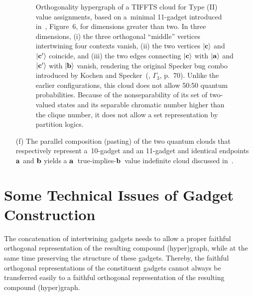 \begin{enumerate}[leftmargin=2.3em,labelsep=4mm]
\begin{figure}[H]
\begin{center}
\begin{tikzpicture} [scale=0.8, rotate= 0]
\end{tikzpicture}
\end{center}
\caption{
\label{2018-c-f-TIFFTS}
Orthogonality hypergraph of a TIFFTS%
 cloud for Type (II) value assignments,
based on a~minimal 11-gadget introduced in~\cite{2018-minimalYIYS}, Figure~6, for dimensions greater than two.
In three dimensions,
(i) the three orthogonal ``middle'' vertices intertwining four contexts vanish,
(ii) the two vertices $\vert {\bf c}\rangle$ and $\vert {\bf c}'\rangle$ coincide, and
(iii) the two edges connecting $\vert {\bf c}\rangle$ with $\vert {\bf a}\rangle$ and $\vert {\bf c}'\rangle$
with $\vert {\bf b}\rangle$ vanish,
rendering the original Specker bug combo introduced by Kochen and Specker~(\cite{Kochen1}, $\Gamma_3$, p.~70).
Unlike the earlier configurations, this cloud does not allow 50:50 quantum probabilities.
Because of the nonseparability of its set of two-valued states
and its separable chromatic number higher than the clique number,
it does not allow a set representation by partition logics.
}
\end{figure}

\item[(f)]
The parallel composition (pasting) of the two quantum clouds that respectively represent a~10-gadget and an 11-gadget
and identical endpoints ${\bf a}$ and ${\bf b}$ yields a ${\bf a}$~true-implies-${\bf b}$~value indefinite cloud discussed in~\cite{2015-AnalyticKS}.

\end{enumerate}


\section{Some Technical Issues of Gadget Construction}

The concatenation of intertwining gadgets needs to allow a proper faithful orthogonal representation
of the resulting compound (hyper)graph, while at the same time preserving the structure of these gadgets.
Thereby, the faithful orthogonal representations of the constituent gadgets cannot always be transferred
easily to a faithful orthogonal representation of the resulting compound (hyper)graph.

